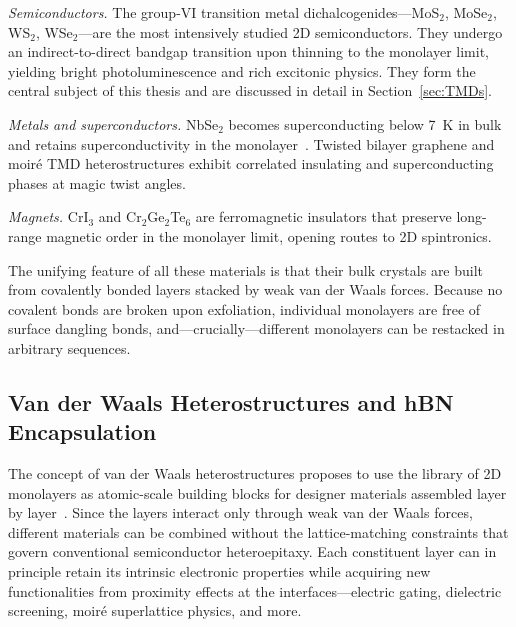 \textit{Semiconductors.}
The group-VI transition metal dichalcogenides---MoS$_2$, MoSe$_2$, WS$_2$, WSe$_2$---are the most intensively studied 2D semiconductors.
They undergo an indirect-to-direct bandgap transition upon thinning to the monolayer limit, yielding bright photoluminescence and rich excitonic physics.
They form the central subject of this thesis and are discussed in detail in Section~\ref{sec:TMDs}.

\textit{Metals and superconductors.}
NbSe$_2$ becomes superconducting below 7~K in bulk and retains superconductivity in the monolayer~\cite{novoselov-2005}.
Twisted bilayer graphene and moiré TMD heterostructures exhibit correlated insulating and superconducting phases at magic twist angles.

\textit{Magnets.}
CrI$_3$ and Cr$_2$Ge$_2$Te$_6$ are ferromagnetic insulators that preserve long-range magnetic order in the monolayer limit, opening routes to 2D spintronics.

The unifying feature of all these materials is that their bulk crystals are built from covalently bonded layers stacked by weak van der Waals forces.
Because no covalent bonds are broken upon exfoliation, individual monolayers are free of surface dangling bonds, and---crucially---different monolayers can be restacked in arbitrary sequences.


\subsection{Van der Waals Heterostructures and hBN Encapsulation}
\label{sec:hBN}

The concept of van der Waals heterostructures proposes to use the library of 2D monolayers as atomic-scale building blocks for designer materials assembled layer by layer~\cite{geim-2013}.
Since the layers interact only through weak van der Waals forces, different materials can be combined without the lattice-matching constraints that govern conventional semiconductor heteroepitaxy.
Each constituent layer can in principle retain its intrinsic electronic properties while acquiring new functionalities from proximity effects at the interfaces---electric gating, dielectric screening, moiré superlattice physics, and more.

